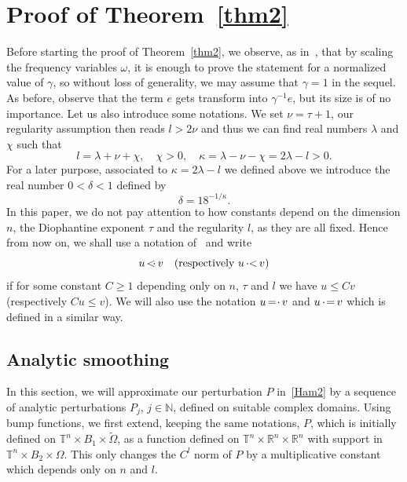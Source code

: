 \documentclass[JEP,XML,SOM,Unicode]{cedram}
\numberwithin{equation}{section}
\theoremstyle{plain}
\theoremstyle{definition}
\newcommand{\N}{\mathbb{N}}
\newcommand{\R}{\mathbb{R}}
\newcommand\T{\mathbb T}
\newcommand\MP{\,{<\hspace{-.5em}\cdot}\,}
\newcommand\PM{\,{\cdot\hspace{-.3em}<}\,}
\newcommand\EP{\,{=\hspace{-.2em}\cdot}\,}
\newcommand\PE{\,{\cdot\hspace{-.2em}=}\,}
\begin{document}
\section{Proof of Theorem~\ref{thm2}}\label{s3}

Before starting the proof of Theorem~\ref{thm2}, we observe, as in~\cite{Pos82}, that by scaling the frequency variables $\omega$, it is enough to prove the statement for a normalized value of $\gamma$, so without loss of generality, we may assume that $\gamma=1$ in the sequel. As before, observe that the term $e$ gets transform into $\gamma^{-1}e$, but its size is of no importance. Let us also introduce some notations. We set $\nu=\tau+1$, our regularity assumption then reads $l>2\nu$ and thus we can find real numbers $\lambda$ and $\chi$ such that
\begin{equation}\label{numbers}
l=\lambda+\nu+\chi, \quad \chi>0, \quad \kappa=\lambda-\nu-\chi=2\lambda-l>0.
\end{equation}
For a later purpose, associated to $\kappa=2\lambda-l$ we defined above we introduce the real number $0<\delta<1$ defined by
\begin{equation}\label{delta}
\delta=18^{-1/\kappa}.
\end{equation}
In this paper, we do not pay attention to how constants depend on the dimension $n$, the Diophantine exponent $\tau$ and the regularity $l$, as they are all fixed. Hence from now on, we shall use a notation of~\cite{Pos01} and write
$$u \MP v \quad (\mbox{respectively } u \PM v)$$
if for some constant $C\geq 1$ depending only on $n$, $\tau$ and $l$ we have $u\leq Cv$ (respectively $Cu \leq v$). We will also use the notation $u \EP v$ and $u \PE v$ which is defined in a similar way.

\subsection{Analytic smoothing}

In this section, we will approximate our perturbation $P$ in~\eqref{Ham2} by a sequence of analytic perturbations $P_j$, $j \in \N$, defined on suitable complex domains. Using bump functions, we first extend, keeping the same notations, $P$, which is initially defined on $\T^n \times B_1 \times \tilde{\Omega}$, as a function defined on $\T^n \times \R^n \times \R^n$ with support in $\T^n \times B_2 \times \Omega$. This only changes the $C^l$ norm of $P$ by a multiplicative constant which depends only on $n$ and $l$.
\end{document}

